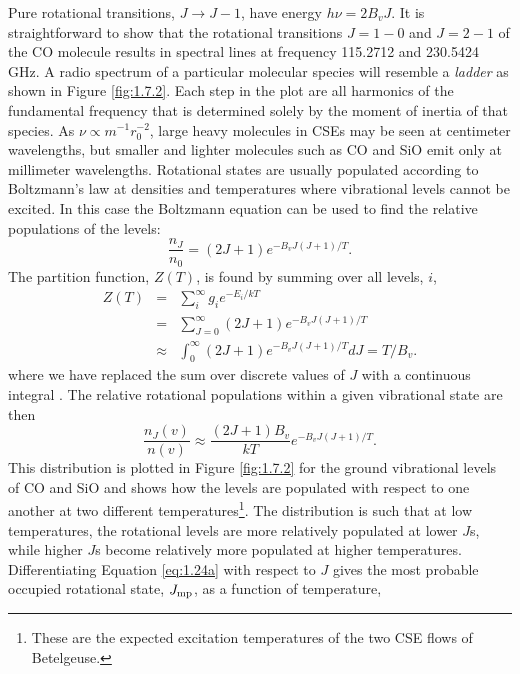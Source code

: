 Pure rotational transitions, $J\rightarrow J-1$, have energy $h\nu = 2B_{v}J$. It is straightforward to show that the rotational transitions $J=1-0$ and $J=2-1$ of the CO molecule results in spectral lines at frequency 115.2712 and 230.5424\,GHz. A radio spectrum of a particular molecular species will resemble a \textit{ladder} as shown in Figure \ref{fig:1.7.2}. Each step in the plot are all harmonics of the fundamental frequency that is determined solely by the moment of inertia of that species. As $\nu \propto m^{-1}r_{0}^{-2}$, large heavy molecules in CSEs may be seen at centimeter wavelengths, but smaller and lighter molecules such as CO and SiO emit only at millimeter wavelengths. 
Rotational states are usually populated according to Boltzmann's law at densities and temperatures where vibrational levels cannot be excited. In this case the Boltzmann equation can be used to find the relative populations of the levels:
\begin{equation}
\frac{n_{J}}{n_{0}}=(2J+1)e^{-B_{v}J(J+1)/T}.
\end{equation}
The partition function, $Z(T)$, is found by summing over all levels, $i$,
\begin{eqnarray}
Z(T) & = & \sum\limits_{i}^{\infty}g_{i}e^{-E_{i}/kT} \\
             & = & \sum\limits_{J=0}^{\infty}(2J+1)e^{-B_{v}J(J+1)/T} \\
              & \approx & \int ^{\infty} _{0}(2J+1)e^{-B_{v}J(J+1)/T} dJ =T/B_{v}.
\end{eqnarray}
where we have replaced the sum over discrete values of $J$ with a continuous integral \citep{shu_1991}. The relative rotational populations within a given vibrational state are then
\begin{equation}\label{eq:1.24a}
\dfrac{n_{J}(v)}{n(v)} \approx \frac{(2J+1)B_{v}}{kT}e^{-B_{v}J(J+1)/T}.
\end{equation}
This distribution is plotted in Figure \ref{fig:1.7.2} for the ground vibrational levels of CO and SiO and shows how the levels are populated with respect to one another at two different temperatures\footnote{These are the expected excitation temperatures of the two CSE flows of Betelgeuse.}. The distribution is such that at low temperatures, the rotational levels are more relatively populated at lower $J$s, while higher $J$s become relatively more populated at higher temperatures. Differentiating Equation \ref{eq:1.24a} with respect to $J$
gives the most probable occupied rotational state, $J_{\rm{mp}}$, as a function of temperature,
